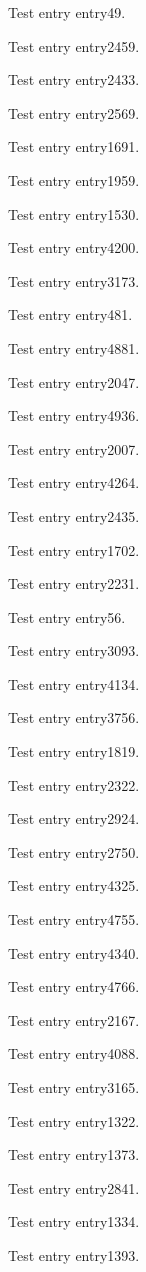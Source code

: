 Test entry \gls{entry49}.

Test entry \gls{entry2459}.

Test entry \gls{entry2433}.

Test entry \gls{entry2569}.

Test entry \gls{entry1691}.

Test entry \gls{entry1959}.

Test entry \gls{entry1530}.

Test entry \gls{entry4200}.

Test entry \gls{entry3173}.

Test entry \gls{entry481}.

Test entry \gls{entry4881}.

Test entry \gls{entry2047}.

Test entry \gls{entry4936}.

Test entry \gls{entry2007}.

Test entry \gls{entry4264}.

Test entry \gls{entry2435}.

Test entry \gls{entry1702}.

Test entry \gls{entry2231}.

Test entry \gls{entry56}.

Test entry \gls{entry3093}.

Test entry \gls{entry4134}.

Test entry \gls{entry3756}.

Test entry \gls{entry1819}.

Test entry \gls{entry2322}.

Test entry \gls{entry2924}.

Test entry \gls{entry2750}.

Test entry \gls{entry4325}.

Test entry \gls{entry4755}.

Test entry \gls{entry4340}.

Test entry \gls{entry4766}.

Test entry \gls{entry2167}.

Test entry \gls{entry4088}.

Test entry \gls{entry3165}.

Test entry \gls{entry1322}.

Test entry \gls{entry1373}.

Test entry \gls{entry2841}.

Test entry \gls{entry1334}.

Test entry \gls{entry1393}.

